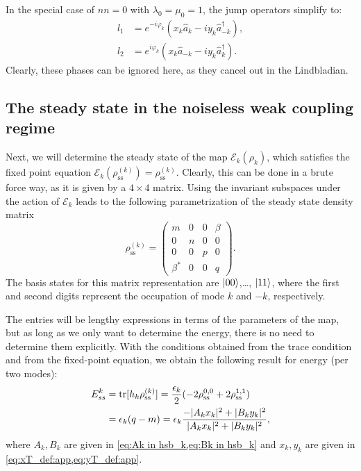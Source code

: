 In the special case of $nn=0$ with $\lambda_0=\mu_0=1$, the jump operators simplify to:
\begin{align}
    l_1 &= e^{-i\varphi_k}(x_k\hat{a}_k-iy_k\hat{a}_{-k}^\dag),\\
    l_2 &= e^{i\varphi_k}(x_k\hat{a}_{-k}-iy_k\hat{a}_{k}^\dag).
\end{align}
Clearly, these phases can be ignored here, as they cancel out in the Lindbladian.
\subsection{The steady state in the noiseless weak coupling regime}
\label{subapp:rho_ss_noiseless}
Next, we will determine the steady state of the map $\mathcal{E}_k(\rho_k)$, which satisfies the fixed point equation $\mathcal{E}_k(\rho_\text{ss}^{(k)})=\rho_\text{ss}^{(k)}$.
Clearly, this can be done in a brute force way, as it is given by a $4\times 4$ matrix. Using the invariant subspaces under the action of $\mathcal{E}_k$ leads to the following parametrization of the steady state density matrix
\begin{equation}
    \rho_\text{ss}^{(k)}=\begin{pmatrix}
        m       &0 &0 &\beta\\
        0       &n &0 &0\\
        0       &0 &p &0\\
        \beta^* &0 &0 &q
    \end{pmatrix}.
\end{equation}
The basis states for this matrix representation are $\ket{00}$,\ldots, $\ket{11}$, where the first and second digits represent the occupation of mode $k$ and $-k$, respectively.


The entries will be lengthy expressions in terms of the parameters of the map, but as long as we only want to determine the energy, there is no need to determine them explicitly. With the conditions obtained from the trace condition and from the fixed-point equation, we obtain the following result for energy (per two modes):
\begin{align}
    E_{ss}^k &=\operatorname{tr}[h_{k}\rho_\text{ss}^{(k)}]=\frac{\epsilon_k}{2}(-2\rho_\text{ss}^{0,0}+2\rho_\text{ss}^{1,1})\nonumber\\
             &= \epsilon_k(q-m)=\epsilon_k\frac{-|A_k x_k|^2+|B_k y_k|^2}{|A_k x_k|^2+|B_k y_k|^2},
    \label{eq:steady_state_energy_mode}
\end{align}
where $A_k, B_k$ are given in \cref{eq:Ak in hsb_k,eq:Bk in hsb_k} and $x_k, y_k$ are given in \cref{eq:xT_def:app,eq:yT_def:app}.

